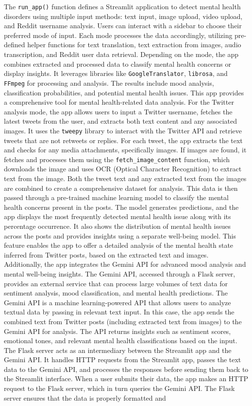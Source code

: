 \pagebreak
\noindent 
The \texttt{run\_app()} function defines a Streamlit application to detect mental health disorders using multiple input methods: text input, image upload, video upload, and Reddit username analysis. Users can interact with a sidebar to choose their preferred mode of input. Each mode processes the data accordingly, utilizing pre-defined helper functions for text translation, text extraction from images, audio transcription, and Reddit user data retrieval. Depending on the mode, the app combines extracted and processed data to classify mental health concerns or display insights. It leverages libraries like \texttt{GoogleTranslator}, \texttt{librosa}, and \texttt{FFmpeg} for processing and analysis. The results include mood analysis, classification probabilities, and potential mental health issues. This app provides a comprehensive tool for mental health-related data analysis. For the Twitter analysis mode, the app allows users to input a Twitter username, fetches the latest tweets from the user, and extracts both text content and any associated images. It uses the \texttt{tweepy} library to interact with the Twitter API and retrieve tweets that are not retweets or replies. For each tweet, the app extracts the text and checks for any media attachments, specifically images. If images are found, it fetches and processes them using the \texttt{fetch\_image\_content} function, which downloads the image and uses OCR (Optical Character Recognition) to extract text from the image. Both the tweet text and any extracted text from the images are combined to create a comprehensive dataset for analysis. This data is then passed through a pre-trained machine learning model to classify the mental health concerns present in the posts. The model generates predictions, and the app displays the most frequently detected mental health issue along with its percentage occurrence. It also shows the distribution of mental health issues across the posts and provides insights using a separate well-being model. This feature enables the app to offer a detailed analysis of the mental health state inferred from Twitter posts, based on the extracted text and images. Additionally, the app integrates the Gemini API for advanced mood analysis and mental well-being insights. The Gemini API, accessed through a Flask server, provides an external service that can process large volumes of text data for sentiment analysis, mood classification, and mental health predictions. The Gemini API is a machine learning-powered API that allows users to analyze textual data by passing in relevant text input. In this case, the app sends the combined text from Twitter posts (including extracted text from images) to the Gemini API for analysis. The API returns insights such as sentiment scores, emotional tones, and relevant mental health classifications based on the input. The Flask server acts as an intermediary between the Streamlit app and the Gemini API. It handles HTTP requests from the Streamlit app, passes the text data to the Gemini API, and processes the responses before sending them back to the Streamlit interface. When a user submits their data, the app makes an HTTP request to the Flask server, which in turn queries the Gemini API. The Flask server ensures that the data is properly formatted and 